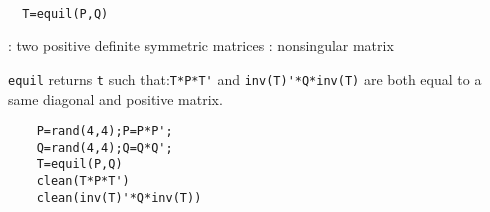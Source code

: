 \begin{mandesc}
   \\ %
\end{mandesc}
\begin{calling_sequence}
\begin{verbatim}
  T=equil(P,Q)  
\end{verbatim}
\end{calling_sequence}
\begin{parameters}
  \begin{varlist}
    : two positive definite symmetric matrices
    : nonsingular matrix
  \end{varlist}
\end{parameters}
\begin{mandescription}
  \verb!equil! returns \verb!t! such that:\verb!T*P*T'! and  \verb!inv(T)'*Q*inv(T)!  are both equal to a same 
  diagonal and positive matrix.
\end{mandescription}
\begin{examples}
  \begin{Verbatim}
    P=rand(4,4);P=P*P';
    Q=rand(4,4);Q=Q*Q';
    T=equil(P,Q)
    clean(T*P*T')
    clean(inv(T)'*Q*inv(T))
  \end{Verbatim}
\end{examples}
\begin{manseealso}
      
\end{manseealso}
